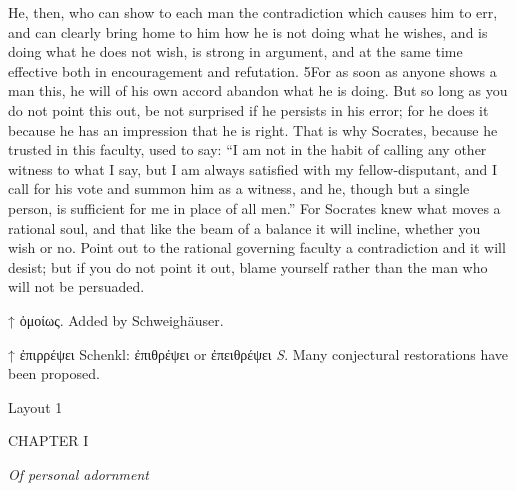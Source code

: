 He, then, who can show to each man the contradiction which causes him to err, and can clearly bring home to him how he is not doing what he wishes, and is doing what he does not wish, is strong in argument, and at the same time effective both in encouragement and refutation. 5For as soon as anyone shows a man this, he will of his own accord abandon what he is doing. But so long as you do not point this out, be not surprised if he persists in his error; for he does it because he has an impression that he is right. That is why Socrates, because he trusted in this faculty, used to say: ``I am not in the habit of calling any other witness to what I say, but I am always satisfied with my fellow-disputant, and I call for his vote and summon him as a witness, and he, though but a single person, is sufficient for me in place of all men.'' For Socrates knew what moves a rational soul, and that like the beam of a balance it will incline, whether you wish or no. Point out to the rational governing faculty a contradiction and it will desist; but if you do not point it out, blame yourself rather than the man who will not be persuaded.



↑ ὁμοίως. Added by Schweighäuser.

↑ ἐπιρρέψει Schenkl: ἐπιθρέψει or ἐπειθρέψει \emph{S}. Many conjectural restorations have been proposed.



Layout 1

CHAPTER I

\emph{Of personal adornment}

